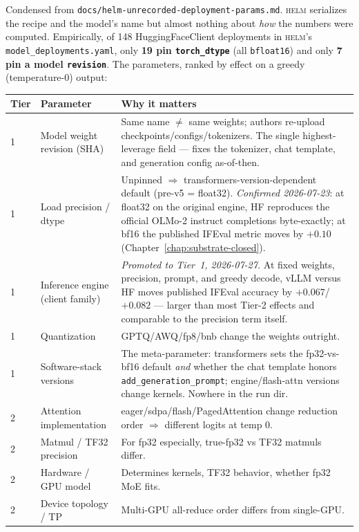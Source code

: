 \documentclass[11pt]{report}
\newcommand{\code}[1]{\texttt{#1}}
\newcommand{\file}[1]{\texttt{#1}}
\begin{document}
Condensed from \file{docs/helm-unrecorded-deployment-params.md}. \textsc{helm}
serializes the recipe and the model's name but almost nothing about \emph{how} the
numbers were computed. Empirically, of 148 HuggingFaceClient deployments in
\textsc{helm}'s \code{model\_deployments.yaml}, only \textbf{19 pin
\code{torch\_dtype}} (all \code{bfloat16}) and only \textbf{7 pin a model
\code{revision}}. The parameters, ranked by effect on a greedy (temperature-0)
output:

\begin{longtable}{@{}p{}p{}p{}@{}}
\toprule
\textbf{Tier} & \textbf{Parameter} & \textbf{Why it matters} \\
\midrule
\endhead
1 & Model weight revision (SHA) & Same name $\ne$ same weights; authors re-upload
    checkpoints/configs/tokenizers. The single highest-leverage field --- fixes the
    tokenizer, chat template, and generation config as-of-then. \\
1 & Load precision / dtype & Unpinned $\Rightarrow$ transformers-version-dependent
    default (pre-v5 = float32). \emph{Confirmed 2026-07-23}: at float32 on the
    original engine, HF reproduces the official OLMo-2 instruct completions
    byte-exactly; at bf16 the published IFEval metric moves by $+0.10$
    (Chapter~\ref{chap:substrate-closed}). \\
1 & Inference engine (client family) & \emph{Promoted to Tier~1, 2026-07-27.} At
    fixed weights, precision, prompt, and greedy decode, vLLM versus HF moves
    published IFEval accuracy by $+0.067$/$+0.082$ --- larger than most Tier-2
    effects and comparable to the precision term itself. \\
1 & Quantization & GPTQ/AWQ/fp8/bnb change the weights outright. \\
1 & Software-stack versions & The meta-parameter: transformers sets the fp32-vs-bf16
    default \emph{and} whether the chat template honors \code{add\_generation\_prompt};
    engine/flash-attn versions change kernels. Nowhere in the run dir. \\
\midrule
2 & Attention implementation & eager/sdpa/flash/PagedAttention change reduction order
    $\Rightarrow$ different logits at temp 0. \\
2 & Matmul / TF32 precision & For fp32 especially, true-fp32 vs TF32 matmuls differ. \\
2 & Hardware / GPU model & Determines kernels, TF32 behavior, whether fp32 MoE fits. \\
2 & Device topology / TP & Multi-GPU all-reduce order differs from single-GPU. \\

\end{longtable}
\end{document}
